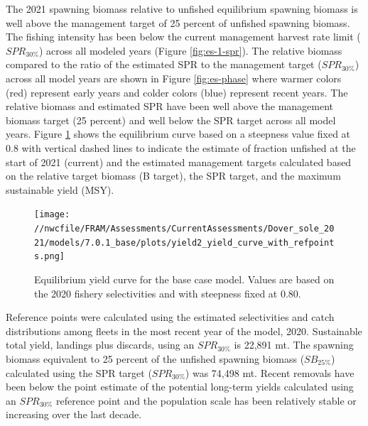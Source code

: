\documentclass[11pt,
  english,
  a4paper,
]{article}
\begin{document}
The 2021 spawning biomass relative to unfished equilibrium spawning biomass is well above the management target of 25 percent of unfished spawning biomass. The fishing intensity has been below the current management harvest rate limit ({\(SPR_{30\%}\)\leavevmode\tagmcend\tagstructend}) across all modeled years (Figure \ref{fig:es-1-spr}). The relative biomass compared to the ratio of the estimated SPR to the management target ({\(SPR_{30\%}\)\leavevmode\tagmcend\tagstructend}) across all model years are shown in Figure \ref{fig:es-phase} where warmer colors (red) represent early years and colder colors (blue) represent recent years. The relative biomass and estimated SPR have been well above the management biomass target (25 percent) and well below the SPR target across all model years. Figure \ref{fig:es-yield} shows the equilibrium curve based on a steepness value fixed at 0.8 with vertical dashed lines to indicate the estimate of fraction unfished at the start of 2021 (current) and the estimated management targets calculated based on the relative target biomass (B target), the SPR target, and the maximum sustainable yield (MSY).

\leavevmode\tagmcend\tagstructend\par


\begin{figure}
\centering
\texttt{[image: //nwcfile/FRAM/Assessments/CurrentAssessments/Dover\_sole\_2021/models/7.0.1\_base/plots/yield2\_yield\_curve\_with\_refpoints.png]}
\caption{Equilibrium yield curve for the base case model. Values are based on the 2020 fishery selectivities and with steepness fixed at 0.80.\label{fig:es-yield}}
\end{figure}

\tagmcend\tagstructend


Reference points were calculated using the estimated selectivities and catch distributions among fleets in the most recent year of the model, 2020. Sustainable total yield, landings plus discards, using an {\(SPR_{30\%}\)\leavevmode\tagmcend\tagstructend} is 22,891 mt. The spawning biomass equivalent to 25 percent of the unfished spawning biomass ({\(SB_{25\%}\)\leavevmode\tagmcend\tagstructend}) calculated using the SPR target ({\(SPR_{30\%}\)\leavevmode\tagmcend\tagstructend}) was 74,498 mt. Recent removals have been below the point estimate of the potential long-term yields calculated using an {\(SPR_{30\%}\)\leavevmode\tagmcend\tagstructend} reference point and the population scale has been relatively stable or increasing over the last decade.
\end{document}
